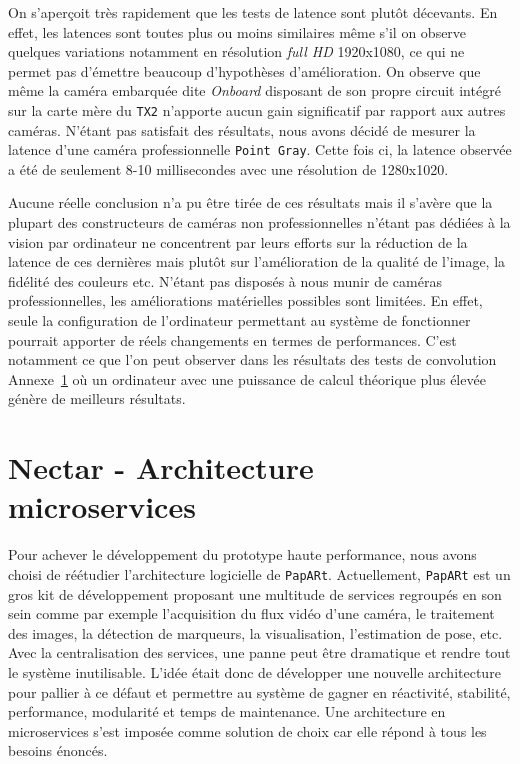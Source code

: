 On s'aperçoit très rapidement que les tests de latence sont plutôt décevants. En effet, les latences sont toutes plus ou moins similaires même s'il on observe quelques variations notamment en résolution \emph{full HD} 1920x1080, ce qui ne permet pas d'émettre beaucoup d'hypothèses d'amélioration. On observe que même la caméra embarquée dite \emph{Onboard} disposant de son propre circuit intégré sur la carte mère du \texttt{TX2} n'apporte aucun gain significatif par rapport aux autres caméras.
N'étant pas satisfait des résultats, nous avons décidé de mesurer la latence d'une caméra professionnelle \texttt{Point Gray}. Cette fois ci, la latence observée a été de seulement 8-10 millisecondes avec une résolution de 1280x1020. 

Aucune réelle conclusion n'a pu être tirée de ces résultats mais il s'avère que la plupart des constructeurs de caméras non professionnelles n'étant pas dédiées à la vision par ordinateur ne concentrent par leurs efforts sur la réduction de la latence de ces dernières mais plutôt sur l'amélioration de la qualité de l'image, la fidélité des couleurs etc. N'étant pas disposés à nous munir de caméras professionnelles, les améliorations matérielles possibles sont limitées. En effet, seule la configuration de l'ordinateur permettant au système de fonctionner pourrait apporter de réels changements en termes de performances. C'est notamment ce que l'on peut observer dans les résultats des tests de convolution Annexe~\hyperref[annexe:bench]{1} où un ordinateur avec une puissance de calcul théorique plus élevée génère de meilleurs résultats.

\newpage
\section{Nectar - Architecture microservices}
\label{sec:nectararchi}

Pour achever le développement du prototype haute performance, nous avons choisi de réétudier l'architecture logicielle de \texttt{PapARt}. 
Actuellement, \texttt{PapARt} est un gros kit de développement proposant une multitude de services regroupés en son sein comme par exemple l'acquisition du flux vidéo d'une caméra, le traitement des images, la détection de marqueurs, la visualisation, l'estimation de pose, etc. Avec la centralisation des services, une panne peut être dramatique et rendre tout le système inutilisable. L'idée était donc de développer une nouvelle architecture pour pallier à ce défaut et permettre au système de gagner en réactivité, stabilité, performance, modularité et temps de maintenance. Une architecture en microservices s'est imposée comme solution de choix car elle répond à tous les besoins énoncés.

